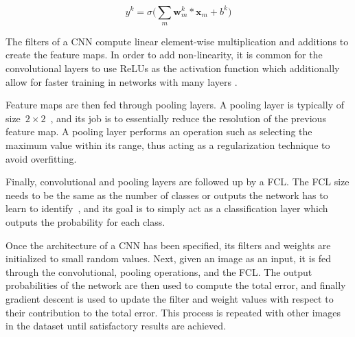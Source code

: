 \begin{equation} \label{cnn:feature-map}
y^k = \sigma{\bigg(\sum_{m} \boldsymbol{w}^{k}_{m} * \boldsymbol{x}_m + b^k \bigg)}
\end{equation}

The filters of a CNN compute linear element-wise multiplication and additions to create the feature maps. In order to add non-linearity, it is common for the convolutional layers to use ReLUs as the activation function which additionally allow for faster training in networks with many layers \cite{cnn-star-galaxy}.

Feature maps are then fed through pooling layers. A pooling layer is typically of size~$2 \times 2$~\cite{NIPS2012_4824}, and  its job is to essentially reduce the resolution of the previous feature map. A pooling layer performs an operation such as selecting the maximum value within its range, thus acting as a regularization technique to avoid overfitting.

Finally, convolutional and pooling layers are followed up by a FCL. The FCL size needs to be the same as the number of classes or outputs the network has to learn to identify~\cite{Ciresan11flexible}, and its goal is to simply act as a classification layer which outputs the probability for each class.

Once the architecture of a CNN has been specified, its filters and weights are initialized to small random values. Next, given an image as an input, it is fed through the convolutional, pooling operations, and the FCL. The output probabilities of the network are then used to compute the total error, and finally gradient descent is used to update the filter and weight values with respect to their contribution to the total error. This process is repeated with other images in the dataset until satisfactory results are achieved.
